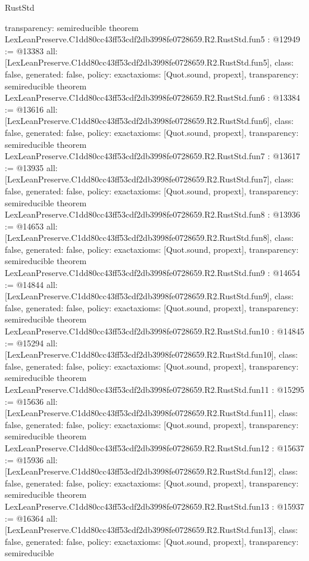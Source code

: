 \begin{lexlean}{RustStd}
\begin{coremodule}
{  transparency: semireducible
}
theorem LexLeanPreserve.C1dd80cc43ff53cdf2db3998fe0728659.R2.RustStd.fun5 : @12949 := @13383 {
  all: [LexLeanPreserve.C1dd80cc43ff53cdf2db3998fe0728659.R2.RustStd.fun5],
  class: false,
  generated: false,
  policy: exact{axioms: [Quot.sound, propext]},
  transparency: semireducible
}
theorem LexLeanPreserve.C1dd80cc43ff53cdf2db3998fe0728659.R2.RustStd.fun6 : @13384 := @13616 {
  all: [LexLeanPreserve.C1dd80cc43ff53cdf2db3998fe0728659.R2.RustStd.fun6],
  class: false,
  generated: false,
  policy: exact{axioms: [Quot.sound, propext]},
  transparency: semireducible
}
theorem LexLeanPreserve.C1dd80cc43ff53cdf2db3998fe0728659.R2.RustStd.fun7 : @13617 := @13935 {
  all: [LexLeanPreserve.C1dd80cc43ff53cdf2db3998fe0728659.R2.RustStd.fun7],
  class: false,
  generated: false,
  policy: exact{axioms: [Quot.sound, propext]},
  transparency: semireducible
}
theorem LexLeanPreserve.C1dd80cc43ff53cdf2db3998fe0728659.R2.RustStd.fun8 : @13936 := @14653 {
  all: [LexLeanPreserve.C1dd80cc43ff53cdf2db3998fe0728659.R2.RustStd.fun8],
  class: false,
  generated: false,
  policy: exact{axioms: [Quot.sound, propext]},
  transparency: semireducible
}
theorem LexLeanPreserve.C1dd80cc43ff53cdf2db3998fe0728659.R2.RustStd.fun9 : @14654 := @14844 {
  all: [LexLeanPreserve.C1dd80cc43ff53cdf2db3998fe0728659.R2.RustStd.fun9],
  class: false,
  generated: false,
  policy: exact{axioms: [Quot.sound, propext]},
  transparency: semireducible
}
theorem LexLeanPreserve.C1dd80cc43ff53cdf2db3998fe0728659.R2.RustStd.fun10 : @14845 := @15294 {
  all: [LexLeanPreserve.C1dd80cc43ff53cdf2db3998fe0728659.R2.RustStd.fun10],
  class: false,
  generated: false,
  policy: exact{axioms: [Quot.sound, propext]},
  transparency: semireducible
}
theorem LexLeanPreserve.C1dd80cc43ff53cdf2db3998fe0728659.R2.RustStd.fun11 : @15295 := @15636 {
  all: [LexLeanPreserve.C1dd80cc43ff53cdf2db3998fe0728659.R2.RustStd.fun11],
  class: false,
  generated: false,
  policy: exact{axioms: [Quot.sound, propext]},
  transparency: semireducible
}
theorem LexLeanPreserve.C1dd80cc43ff53cdf2db3998fe0728659.R2.RustStd.fun12 : @15637 := @15936 {
  all: [LexLeanPreserve.C1dd80cc43ff53cdf2db3998fe0728659.R2.RustStd.fun12],
  class: false,
  generated: false,
  policy: exact{axioms: [Quot.sound, propext]},
  transparency: semireducible
}
theorem LexLeanPreserve.C1dd80cc43ff53cdf2db3998fe0728659.R2.RustStd.fun13 : @15937 := @16364 {
  all: [LexLeanPreserve.C1dd80cc43ff53cdf2db3998fe0728659.R2.RustStd.fun13],
  class: false,
  generated: false,
  policy: exact{axioms: [Quot.sound, propext]},
  transparency: semireducible
}
\end{coremodule}
\end{lexlean}
